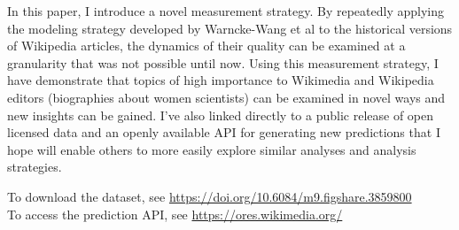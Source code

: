 In this paper, I introduce a novel measurement strategy.  By repeatedly applying the modeling strategy developed by Warncke-Wang et al to the historical versions of Wikipedia articles, the dynamics of their quality can be examined at a granularity that was not possible until now.  Using this measurement strategy, I have demonstrate that topics of high importance to Wikimedia and Wikipedia editors (biographies about women scientists) can be examined in novel ways and new insights can be gained.  I've also linked directly to a public release of open licensed data and an openly available API for generating new predictions that I hope will enable others to more easily explore similar analyses and analysis strategies.

To download the dataset, see \url{https://doi.org/10.6084/m9.figshare.3859800}\\
To access the prediction API, see \url{https://ores.wikimedia.org/}

